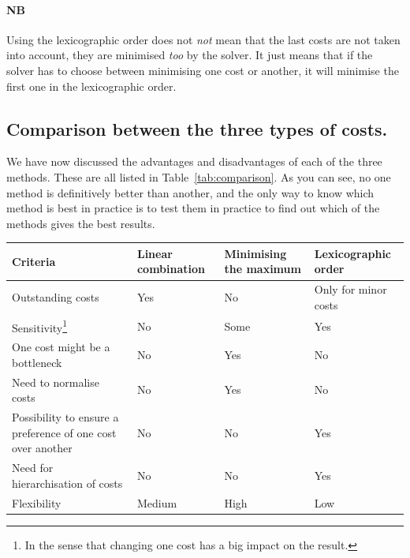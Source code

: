 \paragraph{NB} Using the lexicographic order does not \textit{not} mean that the last costs are not taken into account, they are minimised \textit{too} by the solver. It just means that if the solver has to choose between minimising one cost or another, it will minimise the first one in the lexicographic order. 

\subsection{Comparison between the three types of costs.}

We have now discussed the advantages and disadvantages of each of the three methods. These are all listed in Table~\ref{tab:comparison}. As you can see, no one method is definitively better than another, and the only way to know which method is best in practice is to test them in practice to find out which of the methods gives the best results. 
\begin{center}
    \centering
    \label{tab:comparison}
    \begin{tabularx}{\textwidth}{|>{\centering\arraybackslash}p{4cm}|>{\centering\arraybackslash}X|>{\centering\arraybackslash}X|>{\centering\arraybackslash}X|}
        \hline
        \textbf{Criteria} & \textbf{Linear combination} & \textbf{Minimising the maximum} & \textbf{Lexicographic order} \\
        \hline
        Outstanding costs & \cellcolor{red!25}Yes & \cellcolor{green!25}No & \cellcolor{orange!25}Only for minor costs \\
        \hline
        Sensitivity\footnote{In the sense that changing one cost has a big impact on the result.} & \cellcolor{red!25}No & \cellcolor{orange!25}Some & \cellcolor{green!25}Yes \\
        \hline
        One cost might be a bottleneck & \cellcolor{green!25}No & \cellcolor{red!25}Yes & \cellcolor{green!25}No \\
        \hline
        Need to normalise costs& \cellcolor{green!25}No & \cellcolor{red!25}Yes & \cellcolor{green!25}No \\
        \hline
        Possibility to ensure a preference of one cost over another  & \cellcolor{red!25}No & \cellcolor{red!25}No & \cellcolor{green!25}Yes \\
        \hline
        Need for hierarchisation of costs & \cellcolor{green!25}No & \cellcolor{green!25}No & \cellcolor{red!25}Yes \\
        \hline
        Flexibility & \cellcolor{orange!25}Medium & \cellcolor{green!25}High & \cellcolor{red!25}Low \\
        \hline

    \end{tabularx}
\end{center}

